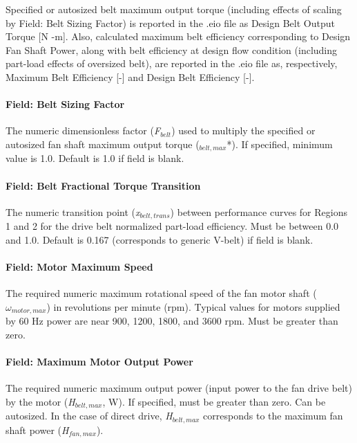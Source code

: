 Specified or autosized belt maximum output torque (including effects of scaling by Field: Belt Sizing Factor) is reported in the .eio file as Design Belt Output Torque {[}N -m{]}. Also, calculated maximum belt efficiency corresponding to Design Fan Shaft Power, along with belt efficiency at design flow condition (including part-load effects of oversized belt), are reported in the .eio file as, respectively, Maximum Belt Efficiency {[}-{]} and Design Belt Efficiency {[}-{]}.

\paragraph{Field: Belt Sizing Factor}\label{field-belt-sizing-factor}

The numeric dimensionless factor (\emph{F\(_{belt}\)}) used to multiply the specified or autosized fan shaft maximum output torque (\(_{belt,max}\)*). If specified, minimum value is 1.0. Default is 1.0 if field is blank.

\paragraph{Field: Belt Fractional Torque Transition}\label{field-belt-fractional-torque-transition}

The numeric transition point (\emph{x\(_{belt,trans}\)}) between performance curves for Regions 1 and 2 for the drive belt normalized part-load efficiency. Must be between 0.0 and 1.0. Default is 0.167 (corresponds to generic V-belt) if field is blank.

\paragraph{Field: Motor Maximum Speed}\label{field-motor-maximum-speed}

The required numeric maximum rotational speed of the fan motor shaft (\(\omega_{motor,max}\)) in revolutions per minute (rpm). Typical values for motors supplied by 60 Hz power are near 900, 1200, 1800, and 3600 rpm. Must be greater than zero.

\paragraph{Field: Maximum Motor Output Power}\label{field-maximum-motor-output-power}

The required numeric maximum output power (input power to the fan drive belt) by the motor (\emph{H\(_{belt,max}\)}, W). If specified, must be greater than zero. Can be autosized. In the case of direct drive, \emph{H\(_{belt,max}\)} corresponds to the maximum fan shaft power (\emph{H\(_{fan,max}\)}).

